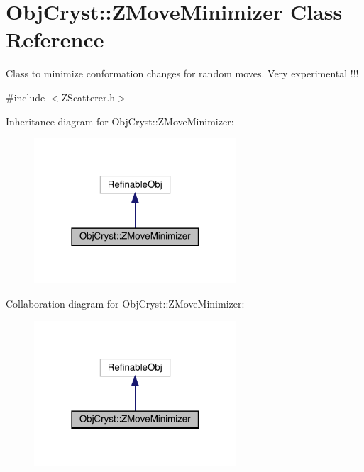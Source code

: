 \hypertarget{class_obj_cryst_1_1_z_move_minimizer}{}\section{Obj\+Cryst\+::Z\+Move\+Minimizer Class Reference}
\label{class_obj_cryst_1_1_z_move_minimizer}


Class to minimize conformation changes for random moves. Very experimental !!!  




{\ttfamily \#include $<$Z\+Scatterer.\+h$>$}



Inheritance diagram for Obj\+Cryst\+::Z\+Move\+Minimizer\+:
\nopagebreak
\begin{figure}[H]
\begin{center}
\leavevmode
\includegraphics[width=214pt]{class_obj_cryst_1_1_z_move_minimizer__inherit__graph}
\end{center}
\end{figure}


Collaboration diagram for Obj\+Cryst\+::Z\+Move\+Minimizer\+:
\nopagebreak
\begin{figure}[H]
\begin{center}
\leavevmode
\includegraphics[width=214pt]{class_obj_cryst_1_1_z_move_minimizer__coll__graph}
\end{center}
\end{figure}
